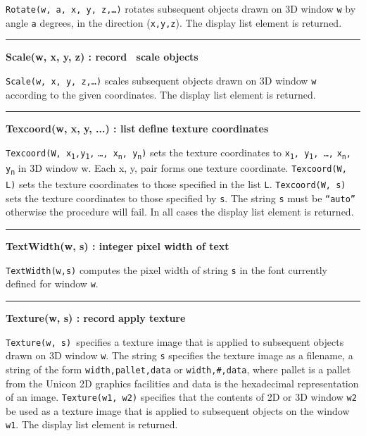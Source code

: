 \noindent
\texttt{Rotate(w, a, x, y, z,{\dots})} rotates subsequent objects drawn
on 3D window \texttt{w} by angle \texttt{a} degrees, in the direction
(\texttt{x,y,z}). The display list element is returned.

\bigskip\hrule\vspace{0.1cm}
\noindent
{\bf Scale(w, x, y, z) : record \hfill\ scale objects}

\noindent
\texttt{Scale(w, x, y, z,{\dots})} scales subsequent objects drawn on 3D
window \texttt{w} according to the given coordinates. The display list
element is returned.

\bigskip\hrule\vspace{0.1cm}
\noindent
{\bf Texcoord(w, x, y, ...) : list } \hfill {\bf define texture coordinates}

\noindent
\texttt{Texcoord(W, x\textsubscript{1},y\textsubscript{1},}
\texttt{{\dots}, x\textsubscript{n}, y\textsubscript{n})}
sets the texture coordinates to
\texttt{x\textsubscript{1}, y\textsubscript{1}, {\dots},}
\texttt{x\textsubscript{n}, y\textsubscript{n}} in
3D window w. Each x, y, pair forms one texture coordinate.
\texttt{Texcoord(W, L)} sets the texture coordinates to those specified
in the list \texttt{L}. \texttt{Texcoord(W, s) }sets the texture
coordinates to those specified by \texttt{s}. The string \texttt{s}
must be \texttt{{\textquotedblleft}auto{\textquotedblright}} otherwise
the procedure will fail. In all cases the display list element is
returned.

\bigskip\hrule\vspace{0.1cm}
\noindent
{\bf TextWidth(w, s) : integer } \hfill {\bf pixel width of text}

\noindent
\texttt{TextWidth(w,s)} computes the pixel width of string \texttt{s} in
the font currently defined for window \texttt{w}.

\bigskip\hrule\vspace{0.1cm}
\noindent
{\bf Texture(w, s) : record } \hfill {\bf apply texture}

\noindent
\texttt{Texture(w, s) }specifies a texture image that is applied to
subsequent objects drawn on 3D window \texttt{w}. The string \texttt{s}
specifies the texture image as a filename, a string of the form
\texttt{width,pallet,data} or \texttt{width,\#,data}, where pallet is a
pallet from the Unicon 2D graphics facilities and data is the
hexadecimal representation of an image. \texttt{Texture(w1, w2)}
specifies that the contents of 2D or 3D window \texttt{w2} be used as
a texture image that is applied to subsequent objects on the window
\texttt{w1}. The display list element is returned.

